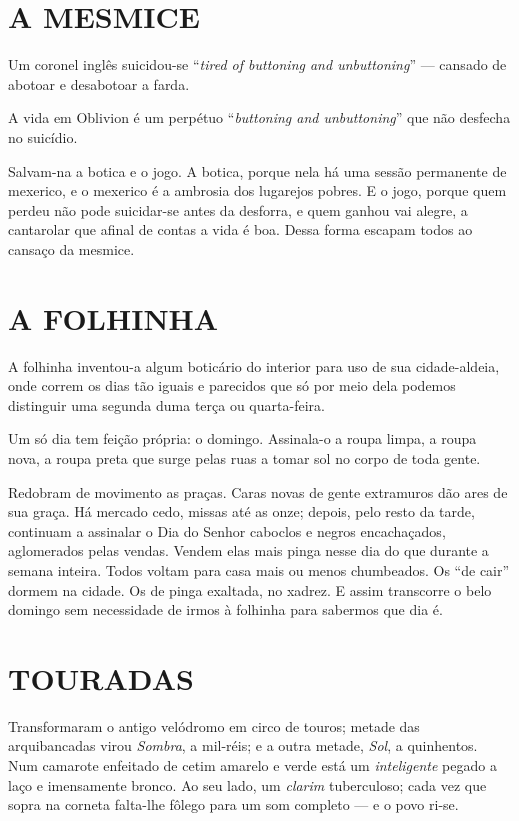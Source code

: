 \section{A MESMICE}

Um coronel inglês suicidou-se ``\emph{tired of buttoning and
unbuttoning}'' --- cansado de abotoar e desabotoar a farda.

A vida em Oblivion é um perpétuo ``\emph{buttoning and unbuttoning}''
que não desfecha no suicídio.

Salvam-na a botica e o jogo. A botica, porque nela há uma sessão
permanente de mexerico, e o mexerico é a ambrosia dos lugarejos pobres.
E o jogo, porque quem perdeu não pode suicidar-se antes da desforra, e
quem ganhou vai alegre, a cantarolar que afinal de contas a vida é boa.
Dessa forma escapam todos ao cansaço da mesmice.

\section{A FOLHINHA}

A folhinha inventou-a algum boticário do interior para uso de sua
cidade-aldeia, onde correm os dias tão iguais e parecidos que só por
meio dela podemos distinguir uma segunda duma terça ou quarta-feira.

Um só dia tem feição própria: o domingo. Assinala-o a roupa limpa, a
roupa nova, a roupa preta que surge pelas ruas a tomar sol no corpo de
toda gente.

Redobram de movimento as praças. Caras novas de gente extramuros dão
ares de sua graça. Há mercado cedo, missas até as onze; depois, pelo
resto da tarde, continuam a assinalar o Dia do Senhor caboclos e negros
encachaçados, aglomerados pelas vendas. Vendem elas mais pinga nesse dia
do que durante a semana inteira. Todos voltam para casa mais ou menos
chumbeados. Os ``de cair'' dormem na cidade. Os de pinga exaltada, no
xadrez. E assim transcorre o belo domingo sem necessidade de irmos à
folhinha para sabermos que dia é.

\section{TOURADAS}

Transformaram o antigo velódromo em circo de touros; metade das
arquibancadas virou \emph{Sombra}, a mil-réis; e a outra metade,
\emph{Sol}, a quinhentos. Num camarote enfeitado de cetim amarelo e
verde está um \emph{inteligente} pegado a laço e imensamente bronco. Ao
seu lado, um \emph{clarim} tuberculoso; cada vez que sopra na corneta
falta-lhe fôlego para um som completo --- e o povo ri-se.

